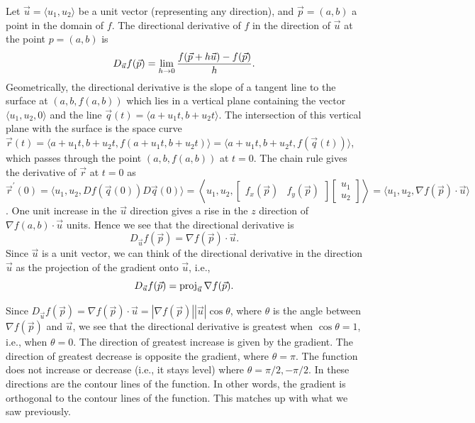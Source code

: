 Let {$\vec u = \langle u_1,u_2\rangle$} be a unit vector
(representing any direction), and {$\vec p=(a,b)$} a point in the domain of
$f$. The directional derivative of $f$ in the direction of $\vec u$ at
the point $p=(a,b)$ is 
$$\displaystyle D_{\vec u} f (\vec p) = \lim_{h\to
  0}\frac{f(\vec p + h\vec u) - f(\vec p)}{h}.$$ Geometrically, the
directional derivative is the slope of a tangent line to the surface
at $(a,b,f(a,b))$ which lies in a vertical plane containing the vector
$\langle u_1,u_2,0\rangle$ and the line $\vec q(t)=\langle a+u_1t,
b+u_2t\rangle$. The intersection of this vertical plane with the
surface is the space curve $\vec r(t) = \langle a+u_1t,b+u_2t,
f(a+u_1t,b+u_2t)\rangle=\langle a+u_1t, b+u_2t,f(\vec q(t))\rangle$,
which passes through the point $(a,b,f(a,b))$ at $t=0$.  The chain
rule gives the derivative of $\vec r$ at $t=0$ as $\vec r^\prime(0) =
\langle u_1,u_2,Df(\vec q(0))D\vec q(0)\rangle = \left<
  u_1,u_2,\begin{bmatrix}f_x(\vec p) & f_y(\vec
    p)\end{bmatrix}\begin{bmatrix}u_1\\u_2\end{bmatrix}\right> =
\langle u_1,u_2,\nabla f(\vec p)\cdot \vec u \rangle $. One unit
increase in the $\vec u$ direction gives a rise in the $z$ direction
of $\nabla f(a,b)\cdot \vec u$ units.  Hence we see that the
directional derivative is $$D_{\vec u} f (\vec p) = \nabla f(\vec
p)\cdot \vec u.$$ Since $\vec u$ is a unit vector, we can think of the
directional derivative in the direction $\vec u$ as the projection of
the gradient onto $\vec u$, i.e., $$D_{\vec u}f(\vec p) = \operatorname{proj}_{\vec
  u}\nabla f(\vec p).$$

Since $D_{\vec u} f (\vec p) = \nabla f(\vec p)\cdot \vec u = |\nabla
f(\vec p)||\vec u|\cos\theta$, where $\theta$ is the angle between
$\nabla f(\vec p)$ and $\vec u$, we see that the directional
derivative is greatest when $\cos\theta=1$, i.e., when $\theta =
0$. The direction of greatest increase is given by the gradient.  The
direction of greatest decrease is opposite the gradient, where
$\theta=\pi$.  The function does not increase or decrease (i.e., it
stays level) where $\theta=\pi/2,-\pi/2$.  In these directions are the
contour lines of the function.  In other words, the gradient is
orthogonal to the contour lines of the function.  This matches up with
what we saw previously.


